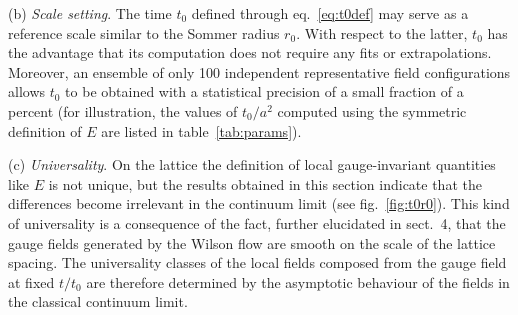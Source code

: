\vspace{0.5ex}
\noindent
(b) \textit{Scale setting}.
The time $t_0$ defined through eq.~\eqref{eq:t0def} may serve as
a reference scale similar to the Sommer radius $r_0$.
With respect to the latter, $t_0$ has the advantage that
its computation does not require any fits or extrapolations.
Moreover, an ensemble of only 100 independent
representative field configurations allows
$t_0$ to be obtained
with a statistical precision of a small fraction of a percent
(for illustration, the values of $t_0/a^2$ computed
using the symmetric definition of $E$ are listed in table~\ref{tab:params}).

\vspace{0.5ex}
\noindent
(c) \textit{Universality}.
On the lattice the definition of
local gauge-invariant quantities like $E$ is not unique,
but the results obtained in this section indicate that
the differences become irrelevant in the continuum limit
(see fig.~\ref{fig:t0r0}).
This kind of universality is a consequence of the fact,
further elucidated in sect.~4, that
the gauge fields generated by the Wilson flow are smooth
on the scale of the lattice spacing.
The universality classes of the local fields composed from the
gauge field at fixed $t/t_0$
are therefore determined by the asymptotic behaviour of the fields
in the classical continuum limit.

